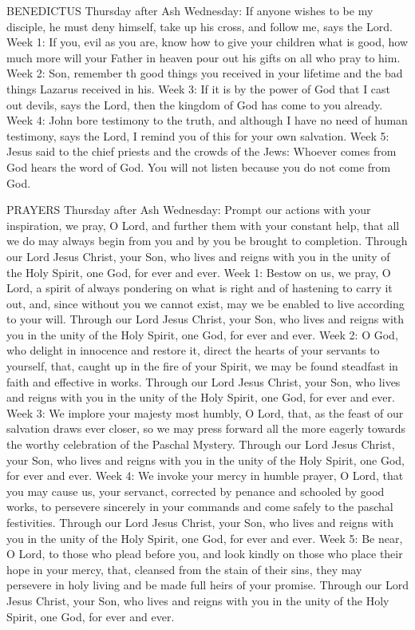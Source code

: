 BENEDICTUS
Thursday after Ash Wednesday:	If anyone wishes to be my disciple, he must deny himself, take up his cross, and follow me, says the Lord.
Week 1:	If you, evil as you are, know how to give your children what is good, how much more will your Father in heaven pour out his gifts on all who pray to him.
Week 2:	Son, remember th good things you received in your lifetime and the bad things Lazarus received in his.
Week 3:	If it is by the power of God that I cast out devils, says the Lord, then the kingdom of God has come to you already. 
Week 4:	John bore testimony to the truth, and although I have no need of human testimony, says the Lord, I remind you of this for your own salvation.
Week 5:	Jesus said to the chief priests and the crowds of the Jews: Whoever comes from God hears the word of God. You will not listen because you do not come from God.

PRAYERS
Thursday after Ash Wednesday:	Prompt our actions with your inspiration, we pray, O Lord, and further them with your constant help, that all we do may always begin from you and by you be brought to completion. Through our Lord Jesus Christ, your Son, who lives and reigns with you in the unity of the Holy Spirit, one God, for ever and ever.
Week 1:	Bestow on us, we pray, O Lord, a spirit of always pondering on what is right and of hastening to carry it out, and, since without you we cannot exist, may we be enabled to live according to your will. Through our Lord Jesus Christ, your Son, who lives and reigns with you in the unity of the Holy Spirit, one God, for ever and ever.
Week 2:	O God, who delight in innocence and restore it, direct the hearts of your servants to yourself, that, caught up in the fire of your Spirit, we may be found steadfast in faith and effective in works. Through our Lord Jesus Christ, your Son, who lives and reigns with you in the unity of the Holy Spirit, one God, for ever and ever.
Week 3:	We implore your majesty most humbly, O Lord, that, as the feast of our salvation draws ever closer, so we may press forward all the more eagerly towards the worthy celebration of the Paschal Mystery. Through our Lord Jesus Christ, your Son, who lives and reigns with you in the unity of the Holy Spirit, one God, for ever and ever.
Week 4:	We invoke your mercy in humble prayer, O Lord, that you may cause us, your servanct, corrected by penance and schooled by good works, to persevere sincerely in your commands and come safely to the paschal festivities. Through our Lord Jesus Christ, your Son, who lives and reigns with you in the unity of the Holy Spirit, one God, for ever and ever.
Week 5:	Be near, O Lord, to those who plead before you, and look kindly on those who place their hope in your mercy, that, cleansed from the stain of their sins, they may persevere in holy living and be made full heirs of your promise. Through our Lord Jesus Christ, your Son, who lives and reigns with you in the unity of the Holy Spirit, one God, for ever and ever.

